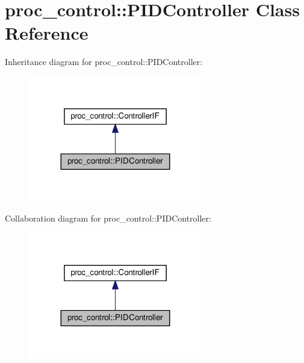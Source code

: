 \hypertarget{classproc__control_1_1_p_i_d_controller}{}\section{proc\+\_\+control\+:\+:P\+I\+D\+Controller Class Reference}
\label{classproc__control_1_1_p_i_d_controller}


Inheritance diagram for proc\+\_\+control\+:\+:P\+I\+D\+Controller\+:\nopagebreak
\begin{figure}[H]
\begin{center}
\leavevmode
\includegraphics[width=215pt]{classproc__control_1_1_p_i_d_controller__inherit__graph}
\end{center}
\end{figure}


Collaboration diagram for proc\+\_\+control\+:\+:P\+I\+D\+Controller\+:\nopagebreak
\begin{figure}[H]
\begin{center}
\leavevmode
\includegraphics[width=215pt]{classproc__control_1_1_p_i_d_controller__coll__graph}
\end{center}
\end{figure}

